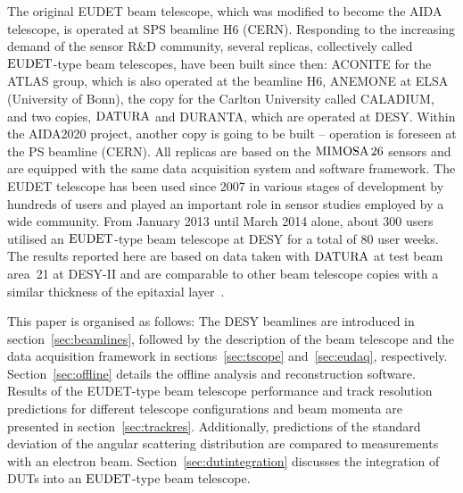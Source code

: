 The original EUDET beam telescope, which was modified to become the AIDA telescope, is operated at SPS beamline H6 (CERN).
Responding to the increasing demand of the sensor R\&D community, several replicas, collectively called $\textrm{EUDET}$-type beam telescopes, have been built since then:
 ACONITE for the ATLAS group, which is also operated at the beamline H6, ANEMONE at ELSA (University of Bonn), the copy for the Carlton University called CALADIUM, 
 and two copies, $\textrm{DATURA}$ and DURANTA, which are operated at DESY. 
 Within the AIDA2020 project, another copy is going to be built -- operation is foreseen at the PS beamline (CERN).
All replicas are based on the $\textrm{MIMOSA\,26}$ sensors and are equipped with the same data acquisition system and software framework. 
The EUDET telescope has been used since 2007 in various stages of development by hundreds of users and played an important role in sensor studies employed by a wide community. 
From January 2013 until March 2014 alone, about 300 users utilised an $\textrm{EUDET}$-type beam telescope at DESY for a total of 80 user weeks. 
The results reported here are based on data taken with $\textrm{DATURA}$ at test beam area~21 at {DESY-II} and are comparable to other beam telescope copies with
a similar thickness of the epitaxial layer~\cite{desy-tscopes-main}. 

This paper is organised as follows: 
The DESY beamlines are introduced in section~\ref{sec:beamlines}, followed by the description of the beam telescope
 and the data acquisition framework in sections~\ref{sec:tscope} and~\ref{sec:eudaq}, respectively.
Section~\ref{sec:offline} details the offline analysis and reconstruction software. 
Results of the EUDET-type beam telescope performance and track resolution predictions for different telescope configurations and beam momenta are presented in section~\ref{sec:trackres}. 
Additionally, predictions of the standard deviation of the angular scattering distribution are compared to measurements with an electron beam. 
Section~\ref{sec:dutintegration} discusses the integration of DUTs into an $\textrm{EUDET}$-type beam telescope. 
